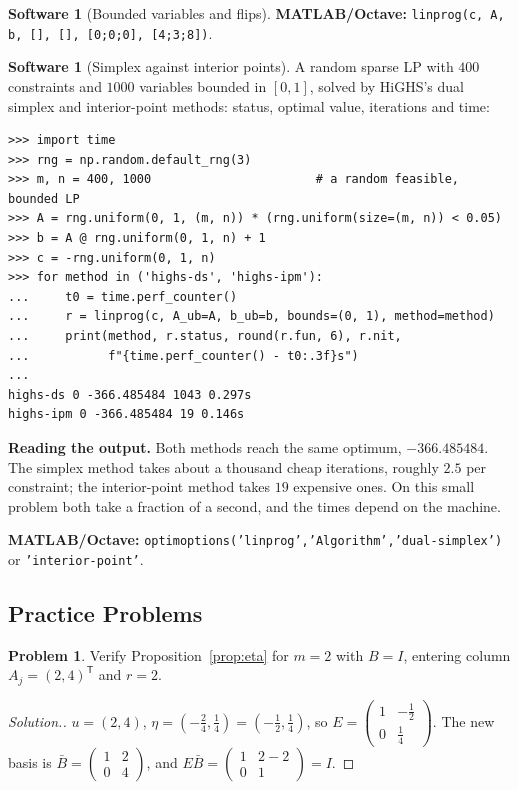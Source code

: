 \documentclass[11pt,a4paper]{article}
\numberwithin{equation}{section}
\theoremstyle{definition}
\newtheorem{software}[thm]{Software}
\newtheorem{problemx}{Problem}[subsection]
\newenvironment{problem}{\begin{problemx}}{\end{problemx}}
\newenvironment{solution}
  {\renewcommand{\qedsymbol}{}\begin{proof}[\textit{Solution}.]}
  {\end{proof}}
\begin{document}
\begin{software}[Bounded variables and flips]
\textbf{MATLAB/Octave:} \texttt{linprog(c, A, b, [], [], [0;0;0], [4;3;8])}.
\end{software}

\begin{software}[Simplex against interior points]
\label{sw:highs}
A random sparse LP with $400$ constraints and $1000$ variables bounded in $[0, 1]$, solved by HiGHS's dual simplex and interior-point methods: status, optimal value, iterations and time:
{\small\begin{verbatim}
>>> import time
>>> rng = np.random.default_rng(3)
>>> m, n = 400, 1000                       # a random feasible, bounded LP
>>> A = rng.uniform(0, 1, (m, n)) * (rng.uniform(size=(m, n)) < 0.05)
>>> b = A @ rng.uniform(0, 1, n) + 1
>>> c = -rng.uniform(0, 1, n)
>>> for method in ('highs-ds', 'highs-ipm'):
...     t0 = time.perf_counter()
...     r = linprog(c, A_ub=A, b_ub=b, bounds=(0, 1), method=method)
...     print(method, r.status, round(r.fun, 6), r.nit,
...           f"{time.perf_counter() - t0:.3f}s")
...
highs-ds 0 -366.485484 1043 0.297s
highs-ipm 0 -366.485484 19 0.146s
\end{verbatim}}
\textbf{Reading the output.} Both methods reach the same optimum, $-366.485484$. The simplex method takes about a thousand cheap iterations, roughly $2.5$ per constraint; the interior-point method takes $19$ expensive ones. On this small problem both take a fraction of a second, and the times depend on the machine.

\textbf{MATLAB/Octave:} \texttt{optimoptions('linprog','Algorithm','dual-simplex')} or \texttt{'interior-point'}.
\end{software}

\subsection{Practice Problems}

\begin{problem}
Verify Proposition~\ref{prop:eta} for $m = 2$ with $B = I$, entering column $A_j = (2, 4)^{\mathsf T}$ and $r = 2$.
\end{problem}

\begin{solution}
$u = (2, 4)$, $\eta = (-\frac24, \frac14) = (-\frac12, \frac14)$, so $E = \begin{pmatrix} 1 & -\frac12 \\ 0 & \frac14 \end{pmatrix}$. The new basis is $\bar B = \begin{pmatrix} 1 & 2 \\ 0 & 4 \end{pmatrix}$, and $E\bar B = \begin{pmatrix} 1 & 2 - 2 \\ 0 & 1 \end{pmatrix} = I$.
\end{solution}
\end{document}
